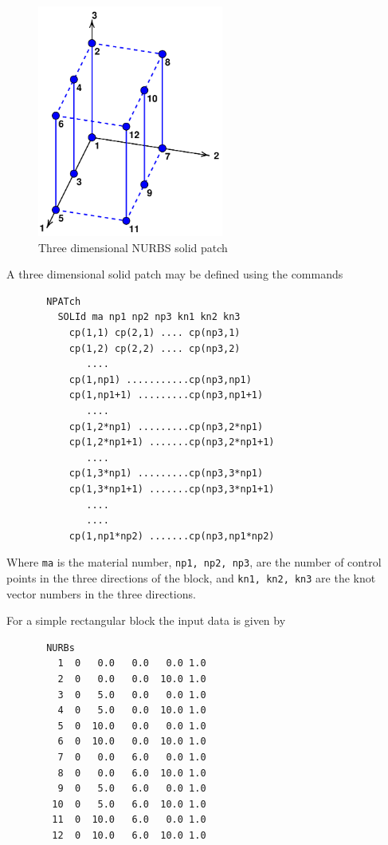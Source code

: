 \begin{figure}[b!]
\begin{center}

\includegraphics[height=3in]{figs/nblock3d}

\caption{Three dimensional NURBS solid patch \label{fig3b} }
\end{center}
\end{figure}

A three dimensional solid patch may be defined using the commands

\begin{minipage}{\textwidth}
\begin{verbatim}
       NPATch
         SOLId ma np1 np2 np3 kn1 kn2 kn3
           cp(1,1) cp(2,1) .... cp(np3,1)
           cp(1,2) cp(2,2) .... cp(np3,2)
              ....
           cp(1,np1) ...........cp(np3,np1)
           cp(1,np1+1) .........cp(np3,np1+1)
              ....
           cp(1,2*np1) .........cp(np3,2*np1)
           cp(1,2*np1+1) .......cp(np3,2*np1+1)
              ....
           cp(1,3*np1) .........cp(np3,3*np1)
           cp(1,3*np1+1) .......cp(np3,3*np1+1)
              ....
              ....
           cp(1,np1*np2) .......cp(np3,np1*np2)
\end{verbatim}
\end{minipage}

Where \texttt{ma} is the material number, \texttt{np1, np2, np3}, are the number of control points in the three directions of the block,
and \texttt{kn1, kn2, kn3} are the knot vector numbers in the three directions.

For a simple rectangular block the input data is given by

\begin{minipage}{\textwidth}
\begin{verbatim}
       NURBs
         1  0   0.0   0.0   0.0 1.0
         2  0   0.0   0.0  10.0 1.0
         3  0   5.0   0.0   0.0 1.0
         4  0   5.0   0.0  10.0 1.0
         5  0  10.0   0.0   0.0 1.0
         6  0  10.0   0.0  10.0 1.0
         7  0   0.0   6.0   0.0 1.0
         8  0   0.0   6.0  10.0 1.0
         9  0   5.0   6.0   0.0 1.0
        10  0   5.0   6.0  10.0 1.0
        11  0  10.0   6.0   0.0 1.0
        12  0  10.0   6.0  10.0 1.0

\end{verbatim}
\end{minipage}


